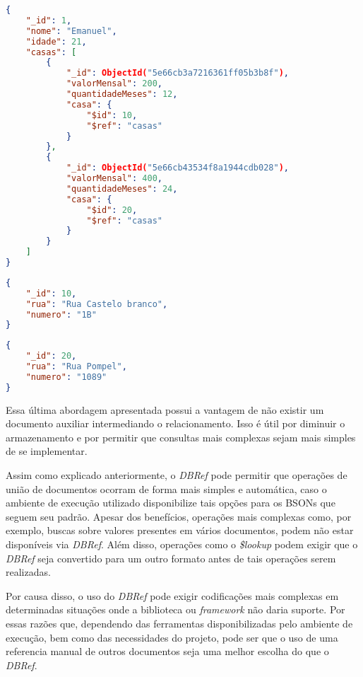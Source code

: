 \begin{lstlisting}[language=json, caption={Documento da Pessoa \textit{Emanuel} Sem Documento Auxiliar\label{lst: doc-dbref-emanuel-sem-documento-auxiliar}}]
{
    "_id": 1,
    "nome": "Emanuel",
    "idade": 21,
    "casas": [
        {
            "_id": ObjectId("5e66cb3a7216361ff05b3b8f"),
            "valorMensal": 200,
            "quantidadeMeses": 12,
            "casa": {
                "$id": 10,
                "$ref": "casas"
            }
        },
        {
            "_id": ObjectId("5e66cb43534f8a1944cdb028"),
            "valorMensal": 400,
            "quantidadeMeses": 24,
            "casa": {
                "$id": 20,
                "$ref": "casas"
            }
        }
    ]
}
\end{lstlisting}

\begin{lstlisting}[language=json, caption={Documento da Casa de Número 1B\label{lst: doc-dbref-casa-1b-sem-documento-auxiliar}}]
{
    "_id": 10,
    "rua": "Rua Castelo branco",
    "numero": "1B"
}
\end{lstlisting}


\begin{lstlisting}[language=json, caption={Documento da Casa de Número 1089\label{lst: doc-dbref-casa-1089-sem-documento-auxiliar}}]
{
    "_id": 20,
    "rua": "Rua Pompel",
    "numero": "1089"
}
\end{lstlisting}

Essa última abordagem apresentada possui a vantagem de não existir um documento auxiliar intermediando o relacionamento. Isso é útil por diminuir o armazenamento e por permitir que consultas mais complexas sejam mais simples de se implementar.

Assim como explicado anteriormente, o \textit{DBRef} pode permitir que operações de união de documentos ocorram de forma mais simples e automática, caso o ambiente de execução utilizado disponibilize tais opções para os BSONs que seguem seu padrão. Apesar dos benefícios, operações mais complexas como, por exemplo, buscas sobre valores presentes em vários documentos, podem não estar disponíveis via \textit{DBRef}. Além disso, operações como o \textit{\$lookup} podem exigir que o \textit{DBRef} seja convertido para um outro formato antes de tais operações serem realizadas. 

Por causa disso, o uso do \textit{DBRef} pode exigir codificações mais complexas em determinadas situações onde a biblioteca ou \textit{framework} não daria suporte. Por essas razões que, dependendo das ferramentas disponibilizadas pelo ambiente de execução, bem como das necessidades do projeto, pode ser que o uso de uma referencia manual de outros documentos seja uma melhor escolha do que o \textit{DBRef}.

